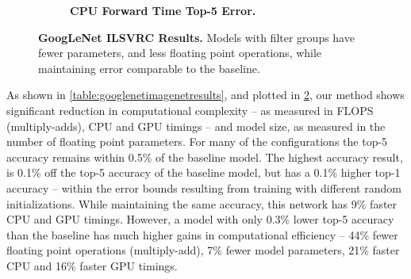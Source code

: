 \documentclass[thesis]{subfiles}
\begin{document}
\begin{figure}[p]
\begin{subfigure}[b]{\textwidth}
			\centering
			\caption{\textbf{CPU Forward Time \vs Top-5 Error.}}
			\label{fig:googlenet50cpuforward}
		\end{subfigure}
		
		\caption[GoogLeNet ILSVRC results.]{\textbf{GoogLeNet ILSVRC Results.} Models with filter groups have fewer parameters, and less floating point operations, while maintaining error comparable to the baseline.}
		\label{fig:googlenet50plots}
	\end{figure}
	
	As shown in \cref{table:googlenetimagenetresults}, and plotted in \cref{fig:googlenet50plots}, our method shows significant reduction in computational complexity -- as measured in FLOPS (multiply-adds), CPU and GPU timings -- and model size, as measured in the number of floating point parameters. For many of the configurations the top-5 accuracy remains within 0.5\% of the baseline model. 
	The highest accuracy result, is 0.1\% off the top-5 accuracy of the baseline model, but has a 0.1\% higher top-1 accuracy -- within the error bounds resulting from training with different random initializations. While maintaining the same accuracy, this network has 9\% faster CPU and GPU timings. However, a model with only 0.3\% lower top-5 accuracy than the baseline has much higher gains in computational efficiency -- 44\% fewer floating point operations (multiply-add), 7\% fewer model parameters, 21\% faster CPU and 16\% faster GPU timings.
	
\end{document}
